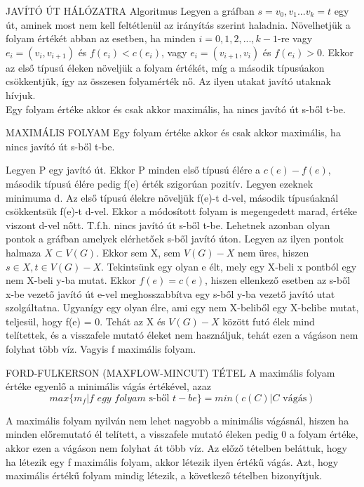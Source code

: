 \begin{tetel}{JAVÍTÓ ÚT HÁLÓZATRA Algoritmus}
Legyen a gráfban $s = v_0, v_1... v_k = t$ egy út, aminek most nem kell feltétlenül az irányítás szerint haladnia. Növelhetjük a folyam értékét abban az esetben, ha minden $i = 0,1,2,...,k-1$-re vagy $e_i = (v_i , v_{i + 1})$ és $f(e_i) < c(e_i) $, vagy $e_i = (v_{i + 1} , v_i )$ és $f(e_i) > 0 $.
Ekkor az első típusú éleken növeljük a folyam értékét, míg a második típusúakon csökkentjük, így az összesen folyamérték nő. Az ilyen utakat javító utaknak hívjuk.\\ Egy folyam értéke akkor és csak akkor maximális, ha nincs javító út s-ből t-be.
\end{tetel}

\begin{tetel}{MAXIMÁLIS FOLYAM}
Egy folyam értéke akkor és csak akkor maximális, ha nincs javító út s-ből t-be.
\end{tetel}

\begin{bizonyitas}{}
Legyen P egy javító út. Ekkor P minden első típusú élére a $c(e) - f(e)$, második típusú élére pedig f(e) érték szigorúan pozitív. Legyen ezeknek minimuma d. Az első típusú élekre növeljük f(e)-t d-vel, második típusúaknál csökkentsük f(e)-t d-vel. Ekkor a módosított folyam is megengedett marad, értéke viszont d-vel nőtt. T.f.h. nincs javító út s-ből t-be. Lehetnek azonban olyan pontok a gráfban amelyek elérhetőek s-ből javító úton. Legyen az ilyen pontok halmaza $X \subset V(G)$. Ekkor sem X, sem $V(G) - X$ nem üres, hiszen $s \in X, t\in V(G) - X$. Tekintsünk egy olyan e élt, mely egy X-beli x pontból egy nem X-beli y-ba mutat. Ekkor $f(e) = c(e)$, hiszen ellenkező esetben az s-ből x-be vezető javító út e-vel meghosszabbítva egy s-ből y-ba vezető javító utat szolgáltatna. Ugyanígy egy olyan élre, ami egy nem X-beliből egy X-belibe mutat, teljesül, hogy f(e) = 0. Tehát az X és $V(G) - X$ között futó élek mind telítettek, és a visszafele mutató éleket nem használjuk, tehát ezen a vágáson nem folyhat több víz. Vagyis f maximális folyam.
\end{bizonyitas}

\begin{tetel}{FORD-FULKERSON (MAXFLOW-MINCUT) TÉTEL}
A maximális folyam értéke egyenlő a minimális vágás értékével, azaz
$$max\{m_f|f\,\,egy\,\,folyam\,\,\text{s-ből}\,\,t-be\} = min(c(C)|C\,\,\text{vágás})$$
\end{tetel}

\begin{bizonyitas}{}
A maximális folyam nyilván nem lehet nagyobb a minimális vágásnál, hiszen ha minden előremutató él telített, a visszafele mutató éleken pedig 0 a folyam értéke, akkor ezen a vágáson nem folyhat át több víz. Az előző tételben beláttuk, hogy ha létezik egy f maximális folyam, akkor létezik ilyen értékű vágás. Azt, hogy maximális értékű folyam mindig létezik, a következő tételben bizonyítjuk.
\end{bizonyitas}

